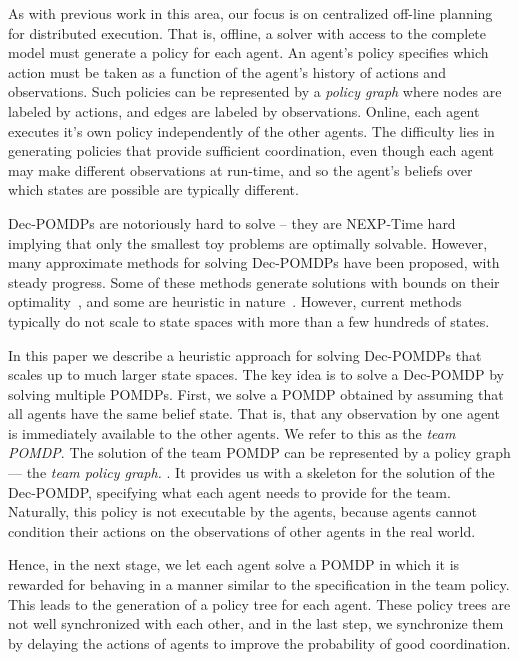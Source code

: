 \documentclass[letterpaper]{article} %
\begin{document}
As with previous work in this area, our focus is on centralized off-line planning for distributed execution. That is, offline, a solver with access to the complete model must generate a policy for each agent. An agent's policy specifies which action must be taken as a function of the agent's history of
actions and observations. Such policies can be represented by a {\em policy graph} where nodes are labeled by actions, and edges are labeled by observations. Online, each agent executes it's own policy independently of the other agents.
The difficulty lies in generating policies that provide sufficient coordination, even though each agent may make different observations at run-time, and so the agent's beliefs over which states are possible are typically different. 

Dec-POMDPs are notoriously hard to solve -- they are NEXP-Time hard~\cite{} implying that only the smallest toy problems are optimally solvable.
However, many approximate methods for solving Dec-POMDPs have been proposed, with steady progress. Some of these methods generate solutions with bounds on
their optimality~\cite{}, and some are heuristic in nature~\cite{}. However, current methods typically do not scale to state spaces with more than a few hundreds of states.


In this paper we describe a heuristic approach for solving Dec-POMDPs that scales up to much larger state spaces. The key idea is to solve a Dec-POMDP by
solving multiple POMDPs. First, we solve a POMDP obtained by assuming that all agents have the same belief state. That is, that any observation by one agent is immediately available to the other agents. We refer to this as the {\em team POMDP}. The solution of the team
POMDP can be represented by a policy graph --- the {\em team policy graph.} . It provides us with a skeleton for the solution of the Dec-POMDP, specifying what each agent needs to provide for the team. Naturally, this policy is not executable by the agents, because agents cannot condition their actions on the observations of other agents in the real world.

Hence, in the next stage, we let each agent solve a POMDP in which it is rewarded for behaving in a manner similar to the specification in the team policy. This leads to the generation of a policy tree for each agent. 
These policy trees are not well synchronized with each other, and in the last step, we synchronize them by delaying the actions of agents to
improve the probability of good coordination. 
\end{document}
